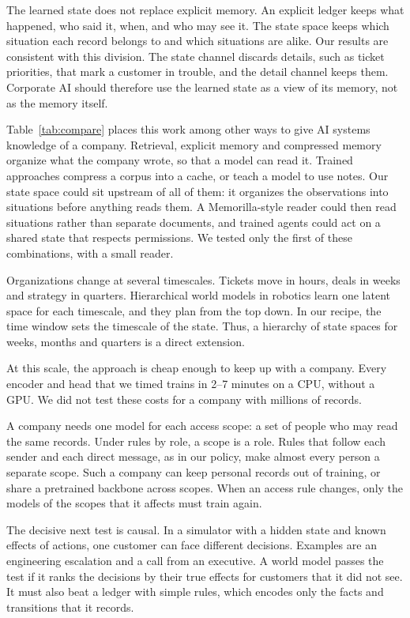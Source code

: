 \documentclass[11pt]{article}
\begin{document}
The learned state does not replace explicit memory. An explicit ledger keeps what happened, who said it, when, and who may see it. The state space keeps which situation each record belongs to and which situations are alike. Our results are consistent with this division. The state channel discards details, such as ticket priorities, that mark a customer in trouble, and the detail channel keeps them. Corporate AI should therefore use the learned state as a view of its memory, not as the memory itself.

Table~\ref{tab:compare} places this work among other ways to give AI systems knowledge of a company. Retrieval, explicit memory and compressed memory organize what the company wrote, so that a model can read it\citep{lewis2020rag,rasmussen2025zep,fallahpour2026memorilla}. Trained approaches compress a corpus into a cache, or teach a model to use notes\citep{eyuboglu2025cartridges,engram2026notes}. Our state space could sit upstream of all of them: it organizes the observations into situations before anything reads them. A Memorilla-style reader could then read situations rather than separate documents, and trained agents could act on a shared state that respects permissions. We tested only the first of these combinations, with a small reader.

Organizations change at several timescales. Tickets move in hours, deals in weeks and strategy in quarters. Hierarchical world models in robotics learn one latent space for each timescale, and they plan from the top down\citep{zhang2026hjepa}. In our recipe, the time window sets the timescale of the state. Thus, a hierarchy of state spaces for weeks, months and quarters is a direct extension.

At this scale, the approach is cheap enough to keep up with a company. Every encoder and head that we timed trains in 2--7 minutes on a CPU, without a GPU. We did not test these costs for a company with millions of records.

A company needs one model for each access scope: a set of people who may read the same records. Under rules by role, a scope is a role. Rules that follow each sender and each direct message, as in our policy, make almost every person a separate scope. Such a company can keep personal records out of training, or share a pretrained backbone across scopes. When an access rule changes, only the models of the scopes that it affects must train again.

The decisive next test is causal. In a simulator with a hidden state and known effects of actions, one customer can face different decisions. Examples are an engineering escalation and a call from an executive. A world model passes the test if it ranks the decisions by their true effects for customers that it did not see. It must also beat a ledger with simple rules, which encodes only the facts and transitions that it records.
\end{document}
